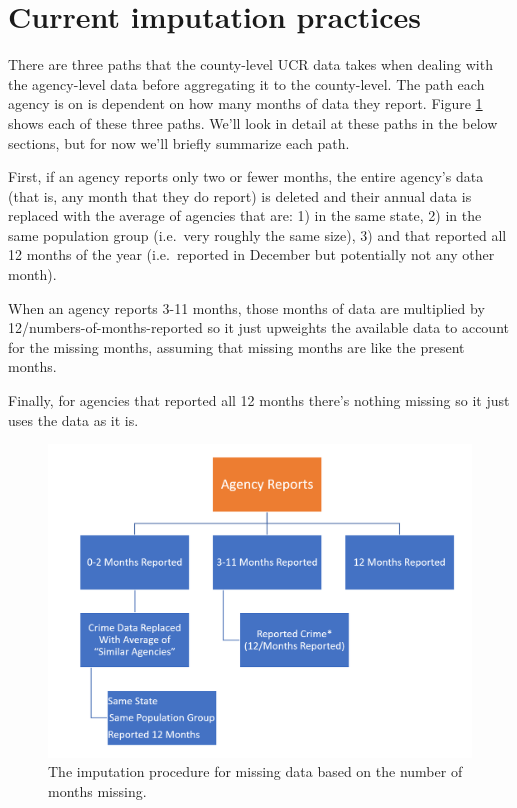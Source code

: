 \documentclass[
  12pt,
  openany]{book}
\begin{document}
\hypertarget{current-imputation-practices}{%
\section{Current imputation practices}\label{current-imputation-practices}}

There are three paths that the county-level UCR data takes when dealing with the agency-level data before aggregating it to the county-level. The path each agency is on is dependent on how many months of data they report. Figure \ref{fig:countyImputation} shows each of these three paths. We'll look in detail at these paths in the below sections, but for now we'll briefly summarize each path.

First, if an agency reports only two or fewer months, the entire agency's data (that is, any month that they do report) is deleted and their annual data is replaced with the average of agencies that are: 1) in the same state, 2) in the same population group (i.e.~very roughly the same size), 3) and that reported all 12 months of the year (i.e.~reported in December but potentially not any other month).

When an agency reports 3-11 months, those months of data are multiplied by 12/numbers-of-months-reported so it just upweights the available data to account for the missing months, assuming that missing months are like the present months.

Finally, for agencies that reported all 12 months there's nothing missing so it just uses the data as it is.

\begin{figure}

{\centering \includegraphics[width=0.9\linewidth]{images/segments_flowchart} 

}

\caption{The imputation procedure for missing data based on the number of months missing.}\label{fig:countyImputation}
\end{figure}
\end{document}
